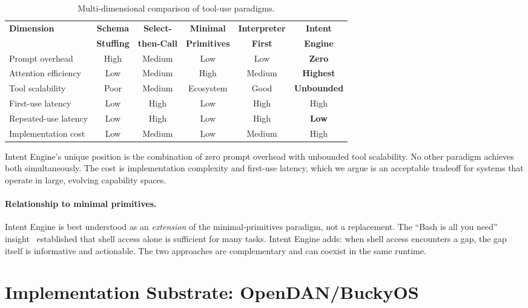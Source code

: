\documentclass[11pt]{article}
\begin{document}
\begin{table}[h]
\centering
\caption{Multi-dimensional comparison of tool-use paradigms.}
\label{tab:comparison}
\small
\begin{tabular}{@{}lccccc@{}}
\toprule
\textbf{Dimension} & \textbf{Schema} & \textbf{Select-} & \textbf{Minimal} & \textbf{Interpreter} & \textbf{Intent} \\
 & \textbf{Stuffing} & \textbf{then-Call} & \textbf{Primitives} & \textbf{First} & \textbf{Engine} \\
\midrule
Prompt overhead & High & Medium & Low & Low & \textbf{Zero} \\
Attention efficiency & Low & Medium & High & Medium & \textbf{Highest} \\
Tool scalability & Poor & Medium & Ecosystem & Good & \textbf{Unbounded} \\
First-use latency & Low & High & Low & High & High \\
Repeated-use latency & Low & High & Low & High & \textbf{Low} \\
Implementation cost & Low & Medium & Low & Medium & High \\
\bottomrule
\end{tabular}
\end{table}

Intent Engine's unique position is the combination of zero prompt overhead with unbounded tool scalability.
No other paradigm achieves both simultaneously.
The cost is implementation complexity and first-use latency, which we argue is an acceptable tradeoff for systems that operate in large, evolving capability spaces.

\paragraph{Relationship to minimal primitives.}
Intent Engine is best understood as an \emph{extension} of the minimal-primitives paradigm, not a replacement.
The ``Bash is all you need'' insight~\citep{shihipar2026bash} established that shell access alone is sufficient for many tasks.
Intent Engine adds: when shell access encounters a gap, the gap itself is informative and actionable.
The two approaches are complementary and can coexist in the same runtime.

\section{Implementation Substrate: OpenDAN/BuckyOS}
\label{sec:implementation}
\end{document}
